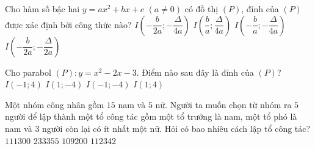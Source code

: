\begin{ex}%
	Cho hàm số bậc hai $y=ax^2+bx+c$ $(a \neq 0)$ có đồ thị $(P)$, đỉnh của $(P)$ được xác định bởi công thức nào? 
	\choice 
		 {\True $I\left(-\dfrac{b}{2a};-\dfrac{\Delta}{4a}\right)$}
		 {$I\left(\dfrac{b}{a};\dfrac{\Delta}{4a}\right)$}
		{$I\left(-\dfrac{b}{a};-\dfrac{\Delta}{4a}\right)$} 
		 {$I\left(-\dfrac{b}{2a};-\dfrac{\Delta}{2a}\right)$}
\end{ex}

\begin{ex}%
	Cho parabol $(P)\colon y=x^2-2x-3$.  Điểm nào sau đây là đỉnh của $(P)$?
	\choice 
		 {$I(-1; 4)$}
		{\True  $I(1;-4)$}
		 {$I(-1;-4)$}
		{$I(1; 4)$} 
\end{ex}

\begin{ex}%
	Một nhóm công nhân gồm $15$ nam và $5$ nữ. Người ta muốn chọn từ nhóm ra  $5$ người để lập thành một tổ công tác gồm một tổ trưởng là nam, một tổ phó là nam và $3$ người còn lại có ít nhất một nữ. Hỏi có bao nhiêu cách lập tổ công tác?
	 \choice
		{\True  $111300$}
		 {$233355$}
		{$109200$} 
		{$112342$} 
\end{ex}

